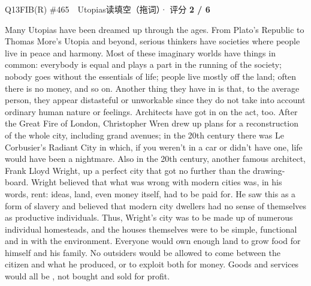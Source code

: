 \begin{qblock}{Q13\quad FIB(R) \#465\ \ Utopias}{读填空（拖词）· 评分 \textcolor{cAccent}{\bfseries 2 / 6}}
\begin{promptbox}
Many Utopias have been dreamed up through the ages. From Plato's Republic to Thomas More's Utopia and beyond, serious thinkers have  societies where people live in peace and harmony. Most of these imaginary worlds have things in common: everybody is equal and plays a part in the running of the society; nobody goes without the essentials of life; people live mostly off the land; often there is no money, and so on. Another thing they have in  is that, to the average person, they appear distasteful or unworkable since they do not take into account ordinary human nature or feelings. Architects have got in on the act, too. After the Great Fire of London, Christopher Wren drew up plans for a reconstruction of the whole city, including  grand avenues; in the 20th century there was Le Corbusier's Radiant City in which, if you weren't in a car or didn't have one, life would have been a nightmare. Also in the 20th century, another famous architect, Frank Lloyd Wright,  up a perfect city that got no further than the drawing-board. Wright believed that what was wrong with modern cities was, in his words, rent: ideas, land, even money itself, had to be paid for. He saw this as a form of slavery and believed that modern city dwellers had no sense of themselves as productive individuals. Thus, Wright's city was to be made up of numerous individual homesteads, and the houses themselves were to be simple, functional and in  with the environment. Everyone would own enough land to grow food for himself and his family. No outsiders would be allowed to come between the citizen and what he produced, or to exploit both for money. Goods and services would all be , not bought and sold for profit.
\end{promptbox}

\end{qblock}
